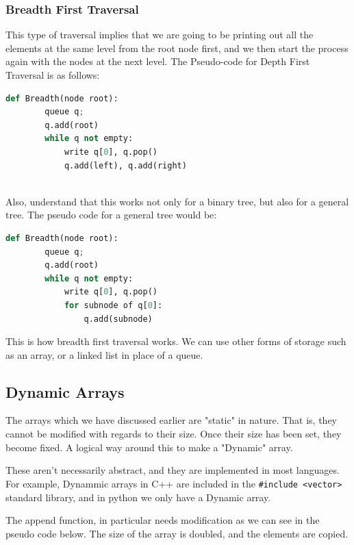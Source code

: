 \documentclass{article}
\theoremstyle{definition}
\theoremstyle{example}
\begin{document}
\subsubsection*{\Large Breadth First Traversal}
\hspace{4mm} This type of traversal implies that we are going to be printing out all the elements at the same level from the root node first, and we then start the process again with the nodes at the next level.
\newpage
The Pseudo-code for Depth First Traversal is as follows:
\vspace{2mm}
\begin{lstlisting}[basicstyle = \Large, language = python]
    def Breadth(node root):
        queue q;
        q.add(root)
        while q not empty:
            write q[0], q.pop()
            q.add(left), q.add(right)
            
\end{lstlisting}
\vspace{3mm}
\hspace{4mm} Also, understand that this works not only for a binary tree, but also for a general tree. The pseudo code for a general tree would be:
\vspace{3mm}
\begin{lstlisting}[language = python, basicstyle = \Large]
    def Breadth(node root):
        queue q;
        q.add(root)
        while q not empty:
            write q[0], q.pop()
            for subnode of q[0]:
                q.add(subnode)
\end{lstlisting}
\vspace{3mm}
This is how breadth first traversal works. We can use other forms of storage such as an array, or a linked list in place of a queue.

\subsection{\Large Dynamic Arrays}
\hspace{4mm} The arrays which we have discussed earlier are "static" in nature. That is, they cannot be modified with regards to their size. Once their size has been set, they become fixed. A logical way around this to make a "Dynamic" array.\par
\vspace{4mm}
These aren't necessarily abstract, and they are implemented in most languages. For example, Dynammic arrays in C++ are included in the \texttt{\#include <vector>} standard library, and in python we only have a Dynamic array.\par
\vspace{4mm}
The append function, in particular needs modification as we can see in the pseudo code below. The size of the array is doubled, and the elements are copied.
\end{document}
